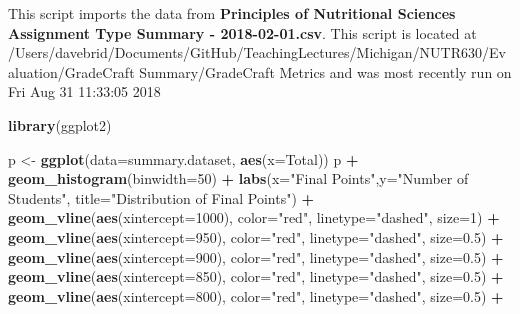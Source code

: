 \documentclass[]{article}
\newenvironment{Shaded}{\begin{snugshade}}{\end{snugshade}}
\newcommand{\KeywordTok}[1]{\textcolor[rgb]{0.13,0.29,0.53}{\textbf{#1}}}
\newcommand{\DataTypeTok}[1]{\textcolor[rgb]{0.13,0.29,0.53}{#1}}
\newcommand{\DecValTok}[1]{\textcolor[rgb]{0.00,0.00,0.81}{#1}}
\newcommand{\FloatTok}[1]{\textcolor[rgb]{0.00,0.00,0.81}{#1}}
\newcommand{\StringTok}[1]{\textcolor[rgb]{0.31,0.60,0.02}{#1}}
\newcommand{\OperatorTok}[1]{\textcolor[rgb]{0.81,0.36,0.00}{\textbf{#1}}}
\newcommand{\NormalTok}[1]{#1}
\begin{document}
This script imports the data from \textbf{Principles of Nutritional
Sciences Assignment Type Summary - 2018-02-01.csv}. This script is
located at
/Users/davebrid/Documents/GitHub/TeachingLectures/Michigan/NUTR630/Evaluation/GradeCraft
Summary/GradeCraft Metrics and was most recently run on Fri Aug 31
11:33:05 2018

\begin{Shaded}
\begin{Highlighting}[]
\KeywordTok{library}\NormalTok{(ggplot2)}

\NormalTok{p <-}\StringTok{ }\KeywordTok{ggplot}\NormalTok{(}\DataTypeTok{data=}\NormalTok{summary.dataset, }\KeywordTok{aes}\NormalTok{(}\DataTypeTok{x=}\NormalTok{Total)) }
\NormalTok{p }\OperatorTok{+}\StringTok{ }\KeywordTok{geom_histogram}\NormalTok{(}\DataTypeTok{binwidth=}\DecValTok{50}\NormalTok{) }\OperatorTok{+}
\StringTok{  }\KeywordTok{labs}\NormalTok{(}\DataTypeTok{x=}\StringTok{"Final Points"}\NormalTok{,}\DataTypeTok{y=}\StringTok{"Number of Students"}\NormalTok{, }\DataTypeTok{title=}\StringTok{"Distribution of Final Points"}\NormalTok{) }\OperatorTok{+}
\StringTok{  }\KeywordTok{geom_vline}\NormalTok{(}\KeywordTok{aes}\NormalTok{(}\DataTypeTok{xintercept=}\DecValTok{1000}\NormalTok{), }\DataTypeTok{color=}\StringTok{"red"}\NormalTok{, }\DataTypeTok{linetype=}\StringTok{"dashed"}\NormalTok{, }\DataTypeTok{size=}\DecValTok{1}\NormalTok{) }\OperatorTok{+}
\StringTok{  }\KeywordTok{geom_vline}\NormalTok{(}\KeywordTok{aes}\NormalTok{(}\DataTypeTok{xintercept=}\DecValTok{950}\NormalTok{), }\DataTypeTok{color=}\StringTok{"red"}\NormalTok{, }\DataTypeTok{linetype=}\StringTok{"dashed"}\NormalTok{, }\DataTypeTok{size=}\FloatTok{0.5}\NormalTok{) }\OperatorTok{+}
\StringTok{  }\KeywordTok{geom_vline}\NormalTok{(}\KeywordTok{aes}\NormalTok{(}\DataTypeTok{xintercept=}\DecValTok{900}\NormalTok{), }\DataTypeTok{color=}\StringTok{"red"}\NormalTok{, }\DataTypeTok{linetype=}\StringTok{"dashed"}\NormalTok{, }\DataTypeTok{size=}\FloatTok{0.5}\NormalTok{) }\OperatorTok{+}
\StringTok{  }\KeywordTok{geom_vline}\NormalTok{(}\KeywordTok{aes}\NormalTok{(}\DataTypeTok{xintercept=}\DecValTok{850}\NormalTok{), }\DataTypeTok{color=}\StringTok{"red"}\NormalTok{, }\DataTypeTok{linetype=}\StringTok{"dashed"}\NormalTok{, }\DataTypeTok{size=}\FloatTok{0.5}\NormalTok{) }\OperatorTok{+}
\StringTok{  }\KeywordTok{geom_vline}\NormalTok{(}\KeywordTok{aes}\NormalTok{(}\DataTypeTok{xintercept=}\DecValTok{800}\NormalTok{), }\DataTypeTok{color=}\StringTok{"red"}\NormalTok{, }\DataTypeTok{linetype=}\StringTok{"dashed"}\NormalTok{, }\DataTypeTok{size=}\FloatTok{0.5}\NormalTok{) }\OperatorTok{+}

\end{Highlighting}
\end{Shaded}
\end{document}
